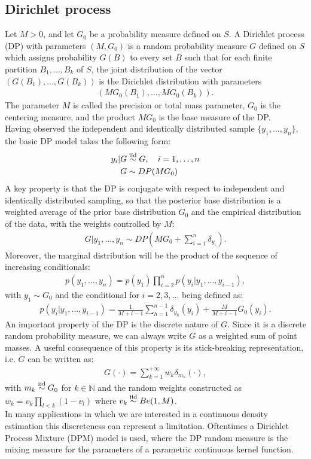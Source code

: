 \subsection{Dirichlet process}
Let $M>0$, and let $G_0$ be a probability measure defined on $S$.
A Dirichlet process (DP) with parameters $(M,G_0)$ is a random probability measure $G$ defined on $S$ which assigns probability $G(B)$ to every set $B$ such that for each finite partition ${B_1,\dots,B_k}$ of $S$, the joint distribution of the  vector $(G(B_1),\dots,G(B_k))$ is the Dirichlet distribution with parameters
\begin{align*}
(MG_0(B_1),\dots,MG_0(B_k)).
\end{align*}
The parameter $M$ is called the precision or total mass parameter, $G_0$ is the centering measure, and the product $MG_0$ is the base measure of the DP. \\
Having observed the independent and identically distributed sample $\{y_1,\dots,y_n\}$, the basic DP model takes the following form:
\begin{equation}
	\begin{aligned}
	y_i | G &\stackrel{\text{iid}}{\sim} G, \quad i=1,\dots,n \\
	G &\sim DP(MG_0)
	\end{aligned}
\end{equation}
A key property is that the DP is conjugate with respect to independent and identically distributed sampling, so that the posterior base distribution is a weighted average of the prior base distribution $G_0$ and the empirical distribution of the data, with the weights controlled by $M$:
\begin{align}
	G | y_1,\dots,y_n \sim DP\left(M G_0 + \sum_{i=1}^n \delta_{y_i}\right).
\end{align}
Moreover, the marginal distribution will be the product of the sequence of increasing conditionals:
\begin{align*}
	p(y_1,\dots,y_n)= p(y_1)\prod\limits_{i=2}^{n} p(y_i|y_1,\dots,y_{i-1}),
\end{align*}
with $y_1 \sim G_0$ and the conditional for $i=2,3,\dots$ being defined as:
\begin{align*}
	p(y_i|y_1,\dots,y_{i-1})= \frac{1}{M+i-1}\sum_{h=1}^{n-1} \delta_{y_h}(y_i) +\frac{M}{M+i-1} G_0(y_i).
\end{align*}
An important property of the DP is the discrete nature of $G$.
Since it is a discrete random probability measure, we can always write $G$ as a weighted sum of point masses.
A useful consequence of this property is its stick-breaking representation, i.e. $G$ can be written as:
\begin{align*}
	G(\cdot) = \sum_{k=1}^{+\infty} w_k \delta_{m_k} (\cdot),
\end{align*}
with $m_k \stackrel{\text{iid}}{\sim} G_0$ for $k\in\mathbb{N}$ and the random weights constructed as $w_k =v_k\prod\limits_{l<k} (1-v_l)$ where $v_k \stackrel{\text{iid}}{\sim} Be(1,M)$. \\
In many applications in which we are interested in a continuous density estimation this discreteness can represent a limitation.
Oftentimes a Dirichlet Process Mixture (DPM) model is used, where the DP random measure is the mixing measure for the parameters of a parametric continuous kernel function.

